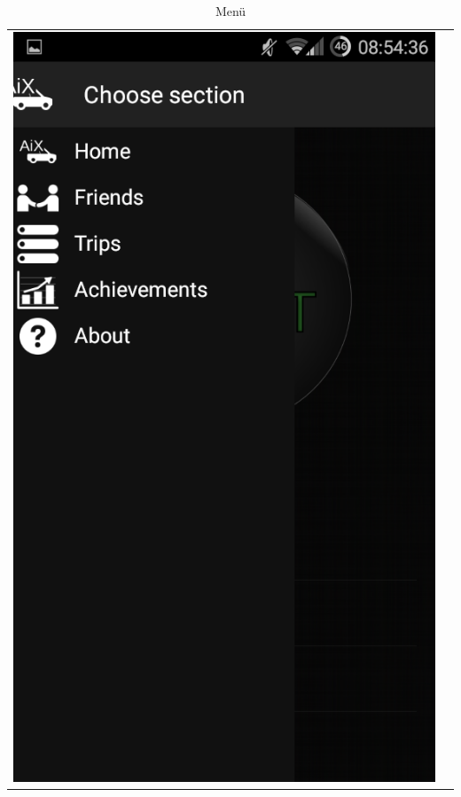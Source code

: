 \documentclass[12pt,a4paper,bibliography=totocnumbered,listof=totocnumbered]{scrartcl}
\begin{document}
\begin{table}
\begin{tabular}{c c}
\begin{minipage}{.5\textwidth}
  \includegraphics[scale=0.3]{images/menu.png}
  \caption{Menü}
  \label{menu}
\end{minipage}

\end{tabular}
\end{table}
\end{document}
